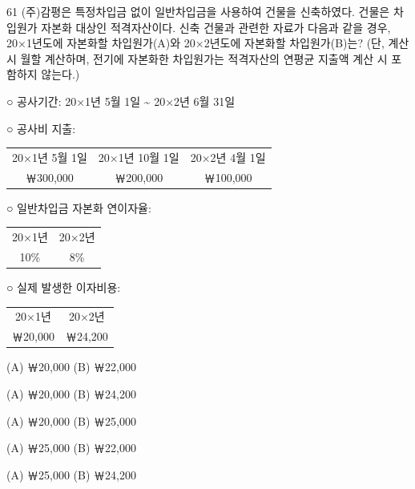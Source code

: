 \begin{question}{61}
(주)감평은 특정차입금 없이 일반차입금을 사용하여 건물을 신축하였다. 건물은 차입원가 자본화 대상인 적격자산이다. 신축 건물과 관련한 자료가 다음과 같을 경우, 20×1년도에 자본화할 차입원가(A)와 20×2년도에 자본화할 차입원가(B)는? (단, 계산시 월할 계산하며, 전기에 자본화한 차입원가는 적격자산의 연평균 지출액 계산 시 포함하지 않는다.)
\begin{framedtext}
○ 공사기간: 20×1년 5월 1일 \textasciitilde{} 20×2년 6월 31일 %
\par
○ 공사비 지출: \par
{\small\centering\begin{tabular}{ccc}
20×1년 5월 1일 & 20×1년 10월 1일 & 20×2년 4월 1일 \\
￦300,000 & ￦200,000 & ￦100,000 \\
\end{tabular}\par}
○ 일반차입금 자본화 연이자율: \par
{\small\centering\begin{tabular}{cc}
20×1년 & 20×2년 \\
10\% & 8\% \\
\end{tabular}\par}
○ 실제 발생한 이자비용: \par
{\small\centering\begin{tabular}{cc}
20×1년 & 20×2년 \\
￦20,000 & ￦24,200 \\
\end{tabular}\par}
\end{framedtext}
\begin{choices}
  \item (A) ￦20,000 \quad (B) ￦22,000
  \item (A) ￦20,000 \quad (B) ￦24,200
  \item (A) ￦20,000 \quad (B) ￦25,000
  \item (A) ￦25,000 \quad (B) ￦22,000
  \item (A) ￦25,000 \quad (B) ￦24,200
\end{choices}
\end{question}

